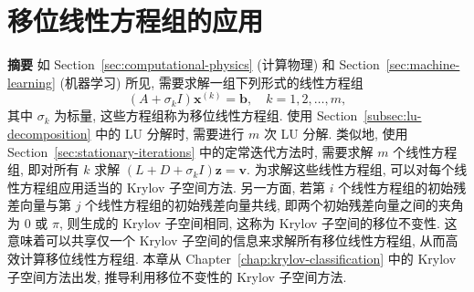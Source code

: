 \clearpage\section{{移位线性方程组的应用}}\label{chap:shifted-linear-systems}\label{srcpage:printed-163}
\setcounter{footnote}{0}
\noindent\textbf{{摘要}}\quad
{如 Section\ \ref{sec:computational-physics} (计算物理) 和 Section\ \ref{sec:machine-learning} (机器学习) 所见, 需要求解一组下列形式的线性方程组}
\[(A+\sigma_k I)\bm x^{(k)}=\bm b,\quad k=1,2,\ldots,m,\]
{其中 $\sigma_k$ 为标量, 这些方程组称为移位线性方程组. 使用 Section\ \ref{subsec:lu-decomposition} 中的 LU 分解时, 需要进行 $m$ 次 LU 分解. 类似地, 使用 Section\ \ref{sec:stationary-iterations} 中的定常迭代方法时, 需要求解 $m$ 个线性方程组, 即对所有 $k$ 求解 $(L+D+\sigma_k I)\bm z=\bm v$. 为求解这些线性方程组, 可以对每个线性方程组应用适当的 Krylov 子空间方法. 另一方面, 若第 $i$ 个线性方程组的初始残差向量与第 $j$ 个线性方程组的初始残差向量共线, 即两个初始残差向量之间的夹角为 $0$ 或 $\pi$, 则生成的 Krylov 子空间相同, 这称为 Krylov 子空间的移位不变性. 这意味着可以共享仅一个 Krylov 子空间的信息来求解所有移位线性方程组, 从而高效计算移位线性方程组. 本章从 Chapter\ \ref{chap:krylov-classification} 中的 Krylov 子空间方法出发, 推导利用移位不变性的 Krylov 子空间方法.}
